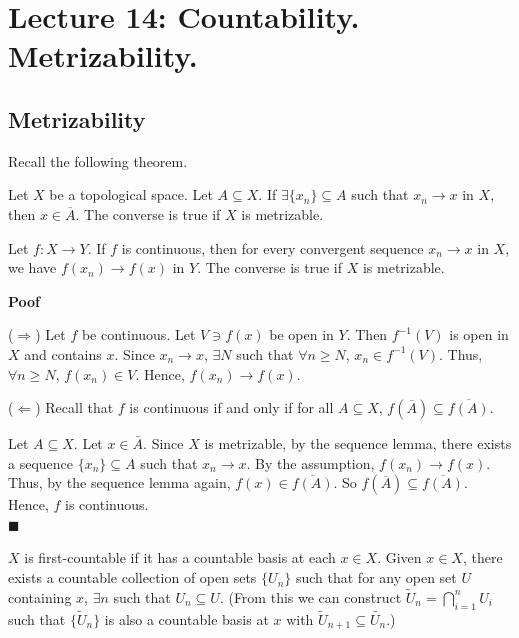 \documentclass[main.tex]{subfiles}
\begin{document}
\pagestyle{plain}
\setcounter{chapter}{13}

\chapter{Lecture 14: Countability. Metrizability. }
\label{chap:chapter14}

\section{Metrizability}
\par Recall the following theorem. 
\begin{theorem}
    Let $X$ be a topological space. Let $A \subseteq X$. If $\exists \{x_n\} \subseteq A$ such that $x_n \to x$ in $X$, then $x \in \overline{A}$. The converse is true if $X$ is metrizable. 
\end{theorem}

\begin{theorem}
    Let $f: X \rightarrow Y$. If $f$ is continuous, then for every convergent sequence $x_n \to x$ in $X$, we have $f(x_n) \to f(x)$ in $Y$. The converse is true if $X$ is metrizable.
\end{theorem}
\par \noindent \textbf{Poof}
\par ($\Rightarrow$) Let $f$ be continuous. Let $V\ni f(x)$ be open in $Y$. Then $f^{-1}(V)$ is open in $X$ and contains $x$. Since $x_n \to x$, $\exists N$ such that $\forall n \geq N$, $x_n \in f^{-1}(V)$. Thus, $\forall n \geq N$, $f(x_n) \in V$. Hence, $f(x_n) \to f(x)$.
\par ($\Leftarrow$) Recall that $f$ is continuous if and only if for all $A \subseteq X$, $f(\overline{A}) \subseteq \overline{f(A)}$. 
\par Let $A \subseteq X$. Let $x\in \bar{A}$. Since $X$ is metrizable, by the sequence lemma, there exists a sequence $\{x_n\} \subseteq A$ such that $x_n \to x$. By the assumption, $f(x_n) \to f(x)$. Thus, by the sequence lemma again, $f(x) \in \overline{f(A)}$. So $f(\overline{A}) \subseteq \overline{f(A)}$. Hence, $f$ is continuous. 
\mbox{} \\ \null \hfill $\blacksquare$

\begin{definition}
    $X$ is first-countable if it has a countable basis at each $x\in X$. Given $x \in X$, there exists a countable collection of open sets $\{U_n\}$ such that for any open set $U$ containing $x$, $\exists n$ such that $U_n \subseteq U$. (From this we can construct $\tilde{U}_n = \bigcap_{i=1}^{n} U_i$ such that $\{\tilde{U}_n\}$ is also a countable basis at $x$ with $\tilde{U}_{n + 1} \subseteq \tilde{U_n}$.)
\end{definition}
\end{document}
